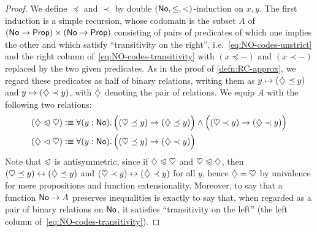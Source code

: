 \begin{proof}
  We define $\preceq$ and $\prec$ by double $(\mathsf{No},\le,<)$-induction on $x,y$.
  The first induction is a simple recursion, whose codomain is the subset $A$ of $(\mathsf{No}\to\mathsf{Prop})\times (\mathsf{No}\to\mathsf{Prop})$ consisting of pairs of predicates of which one implies the other and which satisfy ``transitivity on the right'', i.e.~\eqref{eq:NO-codes-unstrict} and the right column of~\eqref{eq:NO-codes-transitivity} with $(x\preceq -)$ and $(x\prec -)$ replaced by the two given predicates.
  As in the proof of \autoref{defn:RC-approx}, we regard these predicates as half of binary relations, writing them as $y\mapsto (\diamondsuit\preceq y)$ and $y\mapsto (\diamondsuit\prec y)$, with $\diamondsuit$ denoting the pair of relations.
  We equip $A$ with the following two relations:
  \begin{align*}
    (\hlname \ble \hlbname) &\defeq
    \fall{y:\NO} \Big( (\hleb y) \to (\hle y) \Big) \land
    \Big( (\hltb y) \to (\hlt y) \Big)\\
    (\hlname \blt \hlbname) &\defeq
    \fall{y:\NO} \Big( (\hleb y) \to (\hlt y) \Big)
  \end{align*}
  Note that $\trianglelefteqslant$ is antisymmetric, since if $\diamondsuit \trianglelefteqslant \heartsuit$ and $\heartsuit \trianglelefteqslant \diamondsuit$, then $(\heartsuit\preceq y) \leftrightarrow (\diamondsuit\preceq y)$ and $(\heartsuit\prec y) \leftrightarrow (\diamondsuit\prec y)$ for all $y$, hence $\diamondsuit=\heartsuit$ by univalence for mere propositions and function extensionality.
  Moreover, to say that a function $\mathsf{No}\to A$ preserves inequalities is exactly to say that, when regarded as a pair of binary relations on $\mathsf{No}$, it satisfies ``transitivity on the left'' (the left column of~\eqref{eq:NO-codes-transitivity}).


\end{proof}
